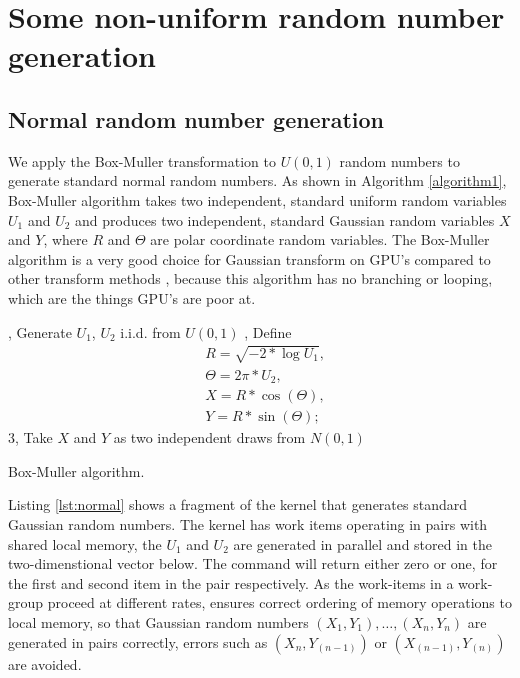 \documentclass[article,nojss]{jss}\usepackage[]{graphicx}\usepackage[]{color}
\begin{document}
\section{Some non-uniform random number generation}
\subsection{Normal random number generation}
We apply the Box-Muller transformation to $U(0,1)$ random numbers to generate standard normal random numbers. As shown in Algorithm \ref{algorithm1}, Box-Muller algorithm takes two independent, standard uniform random variables $U_1$ and $U_2$ and produces two independent, standard Gaussian random variables $X$ and $Y$, where $R$ and $\Theta$ are polar coordinate random variables. %
The Box-Muller algorithm is a very good choice for Gaussian transform on GPU's compared to other transform methods \citep{howes2007efficient}, because this algorithm has no branching or looping, which are the things GPU's are poor at. 

\begin{algorithm}[ht] 
, Generate $U_1$, $U_2$ i.i.d. from $U (0,1)$ , Define \begin{align*} 
& R = \sqrt{-2*\log U_1},\\
&  \Theta = 2\pi*U_2,\\
&  X=R*\cos(\Theta),\\
& Y=R*\sin(\Theta);\;\end{align*}
 3, Take $X$ and $Y$ as two independent draws from $N(0,1)$\;
 \caption{Box-Muller algorithm.}
 \label{algorithm1}
\end{algorithm}


Listing \ref{lst:normal} shows a fragment of the kernel that generates standard Gaussian random numbers. The kernel has work items operating in pairs with shared local memory, the $U_1$ and $U_2$ are generated in parallel and stored in the two-dimenstional vector  below.  The  command will return either zero or one, for the first and second item in the pair respectively.   As the work-items in a work-group proceed at different rates,  ensures correct ordering of memory operations to local memory, so that Gaussian random numbers $(X_1,Y_1), \dots, (X_n,Y_n)$ are generated in pairs correctly, errors such as $(X_n, Y_{(n-1)})$ or $(X_{(n-1)}, Y_{(n)})$ are avoided.
\end{document}
